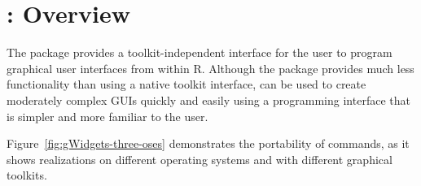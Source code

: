 






 
\newcommand{\ONLYIN}[1]{[only in #1]}

\chapter{: Overview}
\label{sec:overview}




The  package provides a toolkit-independent interface
for the \R\/ user to program graphical user interfaces from within
R. Although the package provides much less functionality than using a
native toolkit interface,  can be used to create
moderately complex GUIs quickly and easily using a programming
interface that is simpler and more familiar to the \R\/ user.

Figure~\ref{fig:gWidgets-three-oses} demonstrates the portability of
 commands, as it shows realizations on different
operating systems and with different graphical toolkits.

